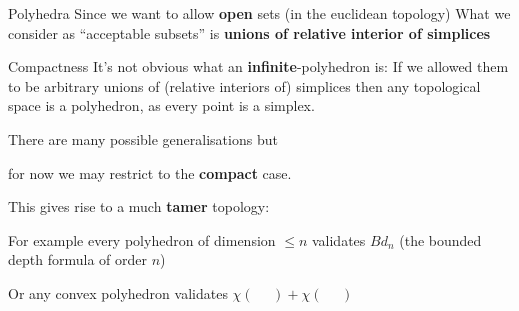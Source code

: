 \documentclass{beamer}
\begin{document}
\begin{frame}{Polyhedra}
    Since we want to allow \textbf{open} sets (in the euclidean topology)
    What we consider as ``acceptable subsets'' is 
    \textbf{unions of relative interior of simplices}
    \vfill
\end{frame}
\begin{frame}{Compactness}
    It's not obvious what an \textbf{infinite}-polyhedron is:
    If we allowed them to be arbitrary unions of (relative interiors of) simplices then 
    any topological space is a polyhedron, as every point is a simplex.

    There are many possible generalisations but
    
    for now we may restrict to the \textbf{compact} case.
\end{frame}
\begin{frame}
    This gives rise to a much \textbf{tamer} topology:

    For example every polyhedron of dimension $\leq n$ 
    validates $Bd_n$ (the bounded depth formula of order $n$)
    \vfill
\end{frame}
\begin{frame}
    Or any convex polyhedron validates $\chi(\ \ \ \ \ \ )+\chi(\ \ \ \ \ \ )$
    \vfill 
\end{frame}
\end{document}
